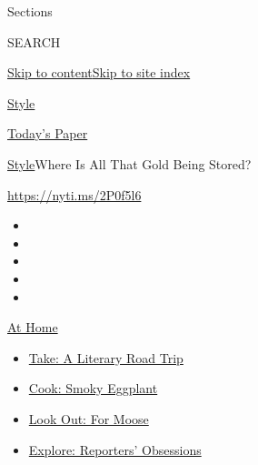 Sections

SEARCH

\protect\hyperlink{site-content}{Skip to
content}\protect\hyperlink{site-index}{Skip to site index}

\href{https://www.nytimes3xbfgragh.onion/section/style}{Style}

\href{https://myaccount.nytimes3xbfgragh.onion/auth/login?response_type=cookie\&client_id=vi}{}

\href{https://www.nytimes3xbfgragh.onion/section/todayspaper}{Today's
Paper}

\href{/section/style}{Style}\textbar{}Where Is All That Gold Being
Stored?

\href{https://nyti.ms/2P0f5l6}{https://nyti.ms/2P0f5l6}

\begin{itemize}
\item
\item
\item
\item
\item
\end{itemize}

\href{https://www.nytimes3xbfgragh.onion/spotlight/at-home?action=click\&pgtype=Article\&state=default\&region=TOP_BANNER\&context=at_home_menu}{At
Home}

\begin{itemize}
\tightlist
\item
  \href{https://www.nytimes3xbfgragh.onion/2020/07/28/books/time-for-a-literary-road-trip.html?action=click\&pgtype=Article\&state=default\&region=TOP_BANNER\&context=at_home_menu}{Take:
  A Literary Road Trip}
\item
  \href{https://www.nytimes3xbfgragh.onion/2020/07/29/magazine/bored-with-your-home-cooking-some-smoky-eggplant-will-fix-that.html?action=click\&pgtype=Article\&state=default\&region=TOP_BANNER\&context=at_home_menu}{Cook:
  Smoky Eggplant}
\item
  \href{https://www.nytimes3xbfgragh.onion/2020/07/27/travel/moose-michigan-isle-royale.html?action=click\&pgtype=Article\&state=default\&region=TOP_BANNER\&context=at_home_menu}{Look
  Out: For Moose}
\item
  \href{https://www.nytimes3xbfgragh.onion/interactive/2020/at-home/even-more-reporters-editors-diaries-lists-recommendations.html?action=click\&pgtype=Article\&state=default\&region=TOP_BANNER\&context=at_home_menu}{Explore:
  Reporters' Obsessions}
\end{itemize}

